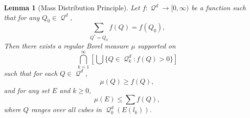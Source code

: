 \documentclass{article}
\DeclareMathOperator{\DQ}{\mathcal{Q}}
\theoremstyle{plain}
\newtheorem{lemma}[theorem]{Lemma}
\begin{document}
\begin{lemma}[Mass Distribution Principle] \label{massdistributionprinciplelem}
    Let $f: \DQ^d \to [0,\infty)$ be a function such that for any $Q_0 \in \DQ^d$,
    \begin{equation} \label{equation73234091} \sum_{Q^* = Q_0} f(Q) = f(Q_0), \end{equation}
    Then there exists a regular Borel measure $\mu$ supported on
    \[ \bigcap_{k = 1}^\infty \left[ \bigcup \{ Q \in \DQ_k^d : f(Q) > 0 \} \right] \]
    such that for each $Q \in \DQ^d$,
    \begin{equation} \label{massdissupperbound} \mu(Q) \geq f(Q), \end{equation}
    and for any set $E$ and $k \geq 0$,
    \begin{equation} \label{massdisslowerbound} \mu(E) \leq \sum f(Q), \end{equation}
    where $Q$ ranges over all cubes in $\DQ^d_k(E(l_k))$.
\end{lemma}
\end{document}
